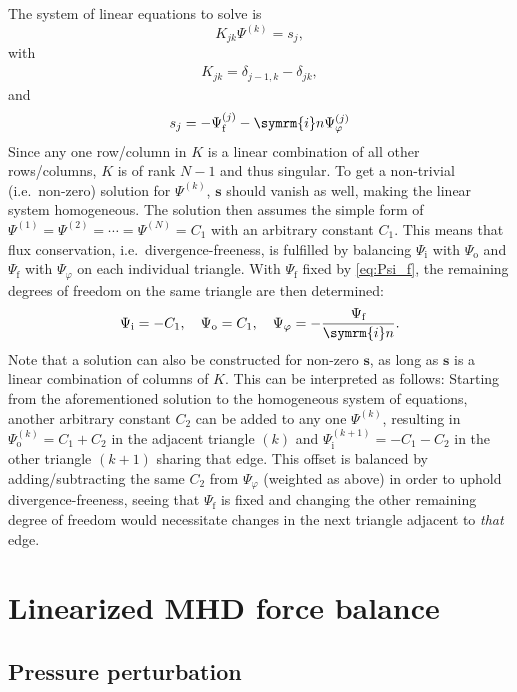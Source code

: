 \documentclass[a4paper, 10pt, english]{article}
\let\temp\varrho
\let\varrho\rho
\let\rho\temp
\let\temp\vartheta
\let\vartheta\theta
\let\theta\temp
\let\temp\varphi
\let\varphi\phi
\let\phi\temp
\let\vec\symbf
\newcommand*\im{\ensuremath{\symrm{i}}}  %
\newcommand*\fs{\ensuremath{\textrm{f}}}  %
\newcommand*\inw{\ensuremath{\textrm{i}}}  %
\newcommand*\out{\ensuremath{\textrm{o}}}  %
\begin{document}
The system of linear equations to solve is
\begin{equation}
  K_{jk} \Psi^{(k)} = s_{j},
\end{equation}
with
\begin{gather}
  K_{jk} = \delta_{j-1, k} - \delta_{jk},
\end{gather}
and
\begin{gather}
  s_{j} = -\Psi_{\fs}^{(j)} - \im n \Psi_{\phi}^{(j)}
\end{gather}
Since any one row/column in $K$ is a linear combination of all other rows/columns, $K$ is of rank $N - 1$ and thus singular. To get a non-trivial (i.e.\ non-zero) solution for $\Psi^{(k)}$, $\vec{s}$ should vanish as well, making the linear system homogeneous. The solution then assumes the simple form of $\Psi^{(1)} = \Psi^{(2)} = \dotsb = \Psi^{(N)} = C_{1}$ with an arbitrary constant $C_{1}$. This means that flux conservation, i.e.\ divergence-freeness, is fulfilled by balancing $\Psi_{\inw}$ with $\Psi_{\out}$ and $\Psi_{\fs}$ with $\Psi_{\phi}$ on each individual triangle. With $\Psi_{\fs}$ fixed by \cref{eq:Psi_f}, the remaining degrees of freedom on the same triangle are then determined:
\begin{gather}
  \Psi_{\inw} = -C_{1}, \quad \Psi_{\out} = C_{1}, \quad \Psi_{\phi} = -\frac{\Psi_{\fs}}{\im n}.
\end{gather}
Note that a solution can also be constructed for non-zero $\vec{s}$, as long as $\vec{s}$ is a linear combination of columns of $K$. This can be interpreted as follows: Starting from the aforementioned solution to the homogeneous system of equations, another arbitrary constant $C_{2}$ can be added to any one $\Psi^{(k)}$, resulting in $\Psi_{\out}^{(k)} = C_{1} + C_{2}$ in the adjacent triangle $(k)$ and $\Psi_{\inw}^{(k+1)} = -C_{1} - C_{2}$  in the other triangle $(k+1)$ sharing that edge. This offset is balanced by adding/subtracting the same $C_{2}$ from $\Psi_{\phi}$ (weighted as above) in order to uphold divergence-freeness, seeing that $\Psi_{\fs}$ is fixed and changing the other remaining degree of freedom would necessitate changes in the next triangle adjacent to \emph{that} edge.

\section{Linearized MHD force balance}

\subsection{Pressure perturbation}
\end{document}
